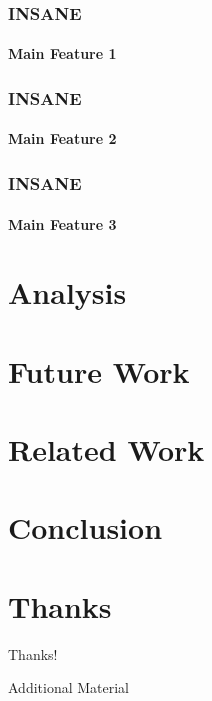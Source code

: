 \documentclass[hyperref={pdfpagelabels=false}]{beamer}
\begin{document}
\begin{frame}
    \frametitle{INSANE}
    \framesubtitle{Main Feature 1}
\end{frame}

\begin{frame}
    \frametitle{INSANE}
    \framesubtitle{Main Feature 2}
\end{frame}

\begin{frame}
    \frametitle{INSANE}
    \framesubtitle{Main Feature 3}
\end{frame}

\section{Analysis}
\begin{frame}
\end{frame}


\section{Future Work}
\begin{frame}
\end{frame}

\section{Related Work}
\begin{frame}
\end{frame}

\section{Conclusion}
\begin{frame}
\end{frame}


\section*{Thanks}
\begin{frame}
    \begin{center}
        Thanks!
    \end{center}
\end{frame}
\appendix
{}
\setcounter{finalframe}{\value{framenumber}}

\begin{frame}
\end{frame}

\begin{frame}
    Additional Material
\end{frame}
\setcounter{framenumber}{\value{finalframe}}
\end{document}
